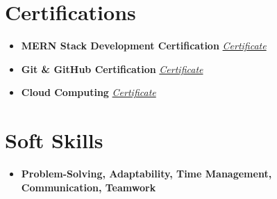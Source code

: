\documentclass[a4paper,11pt]{article}
\begin{document}
\section*{Certifications}
\begin{itemize}[leftmargin=*]
    \item \textbf{MERN Stack Development Certification} \hfill \href{https://www.simplilearn.com/skillup-certificate-landing?token=eyJjb3Vyc2VfaWQiOiIzMzM3IiwiY2VydGlmaWNhdGVfdXJsIjoiaHR0cHM6XC9cL2NlcnRpZmljYXRlcy5zaW1wbGljZG4ubmV0XC9zaGFyZVwvdGh1bWJfNzA1NTg1N18xNzIyNTMzMjY4LnBuZyIsInVzZXJuYW1lIjoiS2F1c2hhbCBLdW1hciJ9}{\textit{Certificate}}
    \item \textbf{Git \& GitHub Certification} \hfill \href{https://www.simplilearn.com/skillup-certificate-landing?token=eyJjb3Vyc2VfaWQiOiI3NTgiLCJjZXJ0aWZpY2F0ZV91cmwiOiJodHRwczpcL1wvY2VydGlmaWNhdGVzLnNpbXBsaWNkbi5uZXRcL3NoYXJlXC90aHVtYl83MDc2NTQ1XzE3MjI4NjQ3MTQucG5nIiwidXNlcm5hbWUiOiJLYXVzaGFsIEt1bWFyIn0%3D}{\textit{Certificate}}
    \item \textbf{Cloud Computing} \hfill \href{https://www.simplilearn.com/skillup-certificate-landing?token=eyJjb3Vyc2VfaWQiOiIxNTExIiwiY2VydGlmaWNhdGVfdXJsIjoiaHR0cHM6XC9cL2NlcnRpZmljYXRlcy5zaW1wbGljZG4ubmV0XC9zaGFyZVwvdGh1bWJfNzA3Mzk4Ml8xNzIyNzcyMjU1LnBuZyIsInVzZXJuYW1lIjoiS2F1c2hhbCBLdW1hciJ9}{\textit{Certificate}}
\end{itemize}

\section*{Soft Skills}
\begin{itemize}[leftmargin=*]
    \item \textbf{Problem-Solving, Adaptability, Time Management, Communication, Teamwork}
\end{itemize}
\end{document}
